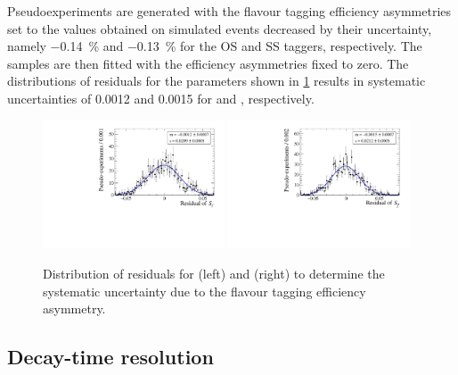 Pseudoexperiments are generated with the flavour tagging efficiency asymmetries set to the values obtained on simulated events decreased by their uncertainty, namely \SI{-0.14}{\percent} and \SI{-0.13}{\percent} for the OS and SS taggers, respectively.
The samples are then fitted with the efficiency asymmetries fixed to zero.
The distributions of residuals for the \CP parameters shown in \cref{fig:systUncertFTeffasym} results in systematic uncertainties of \num{0.0012} and \num{0.0015} for \Sf and \Sfbar, respectively.
\begin{figure}[tbp]
    \centering
    \includegraphics[width=0.48\textwidth]{11Systematics/figs/TagEffAsym_Sf_res.pdf}
    \includegraphics[width=0.48\textwidth]{11Systematics/figs/TagEffAsym_Sfbar_res.pdf}
    \caption{Distribution of residuals for \Sf (left) and \Sfbar (right) to determine the systematic uncertainty due to the flavour tagging efficiency asymmetry.}
    \label{fig:systUncertFTeffasym}
\end{figure}

\subsection*{Decay-time resolution}

